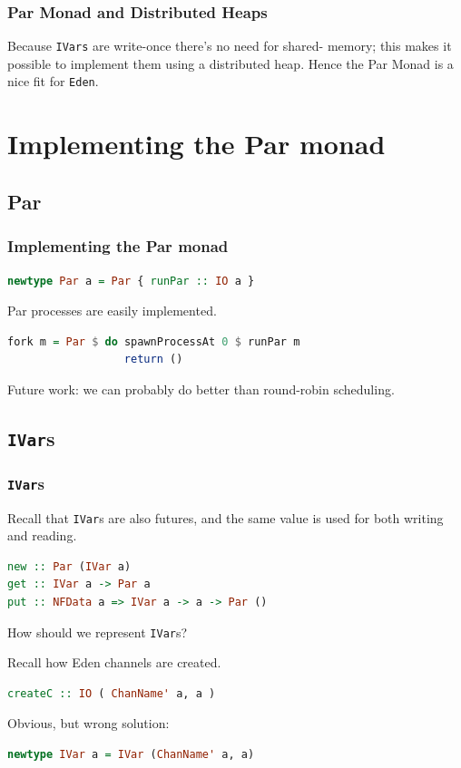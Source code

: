 \documentclass[12pt, danish]{beamer}
\begin{document}
\begin{frame}
  \frametitle{Par Monad and Distributed Heaps}

  Because \texttt{IVars} are write-once there's no need for shared-
  memory; this makes it possible to implement them using a distributed
  heap. Hence the Par Monad is a nice fit for \texttt{Eden}.

\end{frame}

\section{Implementing the Par monad}

\subsection{Par}

\begin{frame}[fragile]
\frametitle{Implementing the Par monad}

\begin{lstlisting}[language=Haskell]
newtype Par a = Par { runPar :: IO a }
\end{lstlisting}
\pause
Par processes are easily implemented.

\begin{lstlisting}[language=Haskell]
fork m = Par $ do spawnProcessAt 0 $ runPar m
                  return ()
\end{lstlisting}
\pause Future work: we can probably do better than round-robin
scheduling.
\end{frame}

\subsection{\texttt{IVar}s}

\begin{frame}[fragile]
\frametitle{\texttt{IVar}s}

Recall that \texttt{IVar}s are also futures, and the same value is
used for both writing and reading.

\begin{lstlisting}[language=Haskell]
new :: Par (IVar a)
get :: IVar a -> Par a
put :: NFData a => IVar a -> a -> Par ()
\end{lstlisting}

How should we represent \texttt{IVar}s?

\pause

Recall how Eden channels are created.

\begin{lstlisting}[language=Haskell]
createC :: IO ( ChanName' a, a )
\end{lstlisting}

\pause

Obvious, but wrong solution:

\begin{lstlisting}[language=Haskell]
newtype IVar a = IVar (ChanName' a, a)
\end{lstlisting}

\end{frame}
\end{document}
